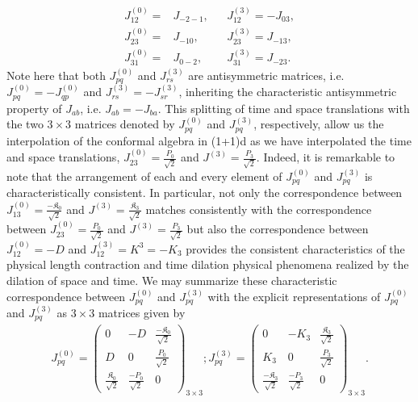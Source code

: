 \documentclass[%
 reprint,
superscriptaddress,
 amsmath,amssymb,
 aps,
]{revtex4-2}
\begin{document}
\begin{align}
\label{correspondence-of-matrix-elements}
    J^{(0)}_{12} =&J_{-2-1},&& J^{(3)}_{12} = -J_{03}, \nonumber\\
    J^{(0)}_{23} =&J_{-10} ,&& J^{(3)}_{23}=J_{-13},\nonumber\\
    J^{(0)}_{31}=&J_{0-2} ,&& J^{(3)}_{31}=J_{-23}.
\end{align}
Note here that both $J^{(0)}_{pq}$ and $J^{(3)}_{rs}$ are antisymmetric matrices, i.e. $J^{(0)}_{pq} = - J^{(0)}_{qp}$ and $J^{(3)}_{rs}=-J^{(3)}_{sr}$, inheriting the characteristic antisymmetric property of $J_{ab}$, i.e. $J_{ab}=-J_{ba}$.  
This splitting of time and space 
translations with the two $3\times3$ matrices denoted by $J^{(0)}_{pq}$ and $J^{(3)}_{pq}$, respectively, allow us the interpolation of the conformal algebra in (1+1)d as we have interpolated the time and space translations, $J^{(0)}_{23}=\frac{P_0}{\sqrt{2}}$ and $J^{(3)}=\frac{P_3}{\sqrt{2}}$. Indeed, it is remarkable to note that the arrangement of each and every element of $J^{(0)}_{pq}$ and $J^{(3)}_{pq}$ is characteristically consistent. In particular, not only the correspondence between $J^{(0)}_{13}=\frac{-\mathfrak{K}_0}{\sqrt{2}}$ and $J^{(3)}=\frac{\mathfrak{K}_3}{\sqrt{2}}$ matches consistently with the correspondence between $J^{(0)}_{23}=\frac{P_0}{\sqrt{2}}$ and $J^{(3)}=\frac{P_3}{\sqrt{2}}$ but also the correspondence between $J^{(0)}_{12}=-D$ and $J^{(3)}_{12}=K^3=-K_3$ provides the consistent characteristics of the physical length contraction and time dilation physical phenomena realized by the dilation of space and time. 
We may summarize these characteristic correspondence between $J^{(0)}_{pq}$ and $J^{(3)}_{pq}$ with the explicit representations of $J^{(0)}_{pq}$ and $J^{(3)}_{pq}$ as $3\times3$ matrices given by 
\begin{align}
  J^{(0)}_{p q}=
  \begin{pmatrix}
  0&-D&\frac{-\mathfrak{K}_0}{\sqrt{2}}\\
  D&0&\frac{P_0}{\sqrt{2}}\\
    \frac{\mathfrak{K}_0}{\sqrt{2}}&\frac{-P_0}{\sqrt{2}}&0  
  \end{pmatrix}_{3\times3}; J^{(3)}_{pq}=
  \begin{pmatrix}
  0&-K_3&\frac{\mathfrak{K}_3}{\sqrt{2}}\\
  K_3&0&\frac{P_3}{\sqrt{2}}\\
    \frac{-\mathfrak{K}_3}{\sqrt{2}}&\frac{-P_3}{\sqrt{2}}&0  
  \end{pmatrix}_{3\times3}.
\end{align}
\end{document}
